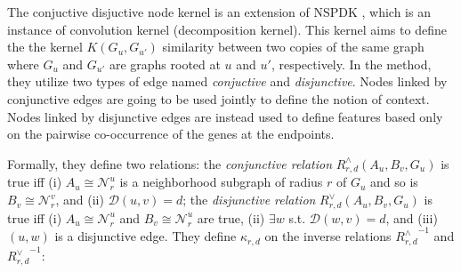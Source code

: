 \documentclass[runningheads,a4paper]{llncs}
\begin{document}
The conjuctive disjuctive node kernel is an extension of NSPDK \cite{?}, which is an instance of convolution kernel (decomposition kernel). This kernel aims to define the the kernel $K(G_u, G_{u'})$ similarity between two copies of the same graph where $G_u$ and $G_{u'}$ are graphs rooted at $u$ and $u'$, respectively. In the method, they utilize two types of edge named \textit{conjuctive} and \textit{disjunctive}. Nodes linked by conjunctive edges are going to be used jointly to define the notion of context. Nodes linked by disjunctive edges are instead used to define features based only on the pairwise co-occurrence of the genes at the endpoints.

Formally, they define two relations: the \textit{conjunctive relation} $R^{\wedge}_{r,d}(A_u, B_v, G_u)$ is true iff (i) $A_u \cong \mathcal{N}_r^u$ is a neighborhood subgraph of radius $r$ of $G_u$ and so is $B_v \cong \mathcal{N}_r^v$,  and (ii) $\mathcal{D}(u,v)= d$; the \textit{disjunctive relation} $R_{r,d}^{\vee}(A_u, B_v, G_u)$ is true iff (i)  $A_u \cong \mathcal{N}_r^u$ and $B_v \cong \mathcal{N}_r^u$ are true, (ii) $\exists w$ s.t. $\mathcal{D}(w,v)= d$, and (iii) $(u,w)$ is a disjunctive edge. They define $\kappa_{r,d}$ on the  inverse relations ${R^{\wedge}_{r,d}}^{ -1}$ and ${R^{\vee}_{r,d}}^{ -1}$:


%
\end{document}
